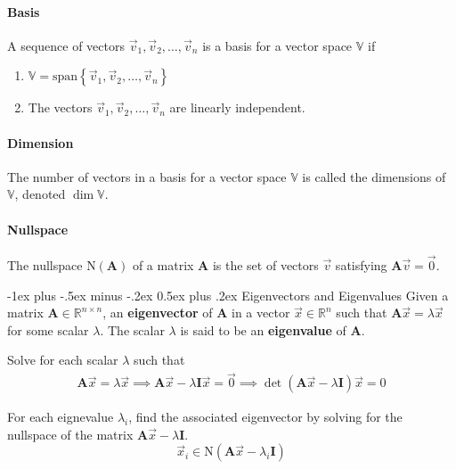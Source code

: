 \documentclass[10pt,landscape,letterpaper]{article}
\makeatletter
\renewcommand{\section}{\@startsection{section}{1}{0mm}%
                                {-1ex plus -.5ex minus -.2ex}%
                                {0.5ex plus .2ex}%
                                {\normalfont\large\bfseries}}
\newcommand{\matr}[1]{\mathbf{#1}}
\newcommand{\vecspace}[1]{\mathbb{#1}}
\newcommand\cheatsheetmargin{0.2cm}
\makeatother
\begin{document}
\begin{multicols}{3}
\paragraph{Basis}
A sequence of vectors $\vec{v}_1, \vec{v}_2, \ldots, \vec{v}_n$ is a basis for a vector space $\vecspace{V}$ if
\begin{enumerate}[noitemsep]
    \item $\vecspace{V}= \mathrm{span}\left\{\vec{v}_1, \vec{v}_2, \ldots, \vec{v}_n\right\}$
    \item The vectors $\vec{v}_1, \vec{v}_2, \ldots, \vec{v}_n$ are linearly independent.
\end{enumerate}

\paragraph{Dimension} The number of vectors in a basis for a vector space $\vecspace{V}$ is called the dimensions of $\vecspace{V}$, denoted $\dim \vecspace{V}$.

\paragraph{Nullspace}
The nullspace $\mathrm{N}(\matr{A})$ of a matrix $\matr{A}$ is the set of vectors $\vec{v}$ satisfying $\matr{A}\vec{v} = \vec{0}$.

\section{Eigenvectors and Eigenvalues}
Given a matrix $\matr{A}\in\vecspace{R}^{n\times n}$, an \textbf{eigenvector} of $\matr{A}$ in a vector $\vec{x}\in\vecspace{R}^n$ such that $\matr{A}\vec{x} = \lambda\vec{x}$ for some scalar $\lambda$. The scalar $\lambda$ is said to be an \textbf{eigenvalue} of $\matr{A}$.
\begin{description}[style=unboxed,leftmargin=\cheatsheetmargin+0.2cm, topsep=0.2cm]
    \item[Computing Eigenvalues]
        Solve for each scalar $\lambda$ such that
        \begin{gather*}
            \matr{A}\vec{x} = \lambda\vec{x} \implies \matr{A}\vec{x} - \lambda \matr{I}\vec{x} = \vec{0} \implies \boxed{\det \left( \matr{A}\vec{x} - \lambda \matr{I}\right)\vec{x} = 0}
        \end{gather*}
        
        For each eignevalue $\lambda_i$, find the associated eigenvector by solving for the nullspace of the matrix $\matr{A}\vec{x} - \lambda \matr{I}$.
        \begin{equation*}
            \vec{x}_i \in \mathrm{N}(\matr{A}\vec{x} - \lambda_i \matr{I})
        \end{equation*}
    

\end{description}
\end{multicols}
\end{document}

